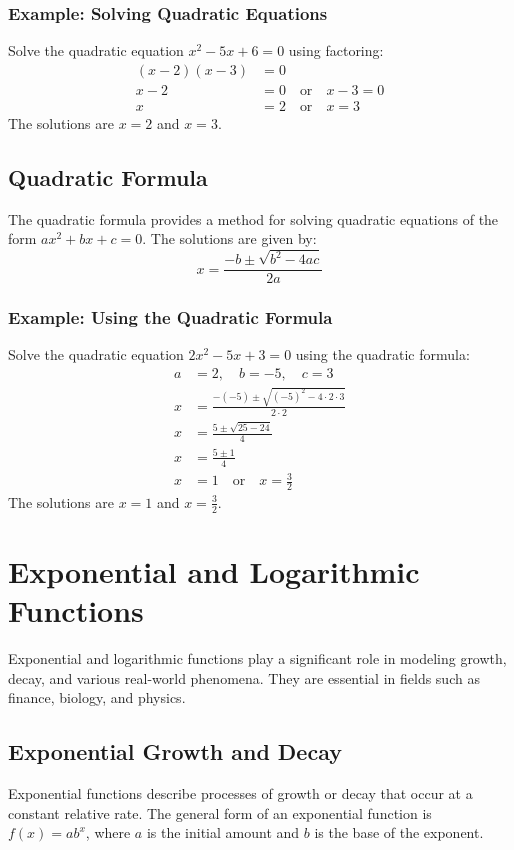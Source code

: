\documentclass{article}
\begin{document}
\subsubsection{Example: Solving Quadratic Equations}
Solve the quadratic equation $x^2 - 5x + 6 = 0$ using factoring:
\begin{align*}
    (x - 2)(x - 3) &= 0 \\
    x - 2 &= 0 \quad \text{or} \quad x - 3 = 0 \\
    x &= 2 \quad \text{or} \quad x = 3
\end{align*}
The solutions are $x = 2$ and $x = 3$.

\subsection{Quadratic Formula}
The quadratic formula provides a method for solving quadratic equations of the form $ax^2 + bx + c = 0$. The solutions are given by:
\[ x = \frac{-b \pm \sqrt{b^2 - 4ac}}{2a} \]

\subsubsection{Example: Using the Quadratic Formula}
Solve the quadratic equation $2x^2 - 5x + 3 = 0$ using the quadratic formula:
\begin{align*}
    a &= 2, \quad b = -5, \quad c = 3 \\
    x &= \frac{-(-5) \pm \sqrt{(-5)^2 - 4 \cdot 2 \cdot 3}}{2 \cdot 2} \\
    x &= \frac{5 \pm \sqrt{25 - 24}}{4} \\
    x &= \frac{5 \pm 1}{4} \\
    x &= 1 \quad \text{or} \quad x = \frac{3}{2}
\end{align*}
The solutions are $x = 1$ and $x = \frac{3}{2}$.

\section{Exponential and Logarithmic Functions}
Exponential and logarithmic functions play a significant role in modeling growth, decay, and various real-world phenomena. They are essential in fields such as finance, biology, and physics.

\subsection{Exponential Growth and Decay}
Exponential functions describe processes of growth or decay that occur at a constant relative rate. The general form of an exponential function is $f(x) = ab^x$, where $a$ is the initial amount and $b$ is the base of the exponent.
\end{document}

